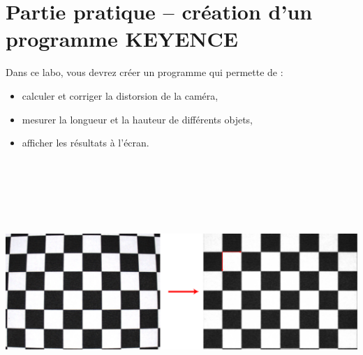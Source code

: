 \section{Partie pratique – création d’un programme KEYENCE} 
\noindent Dans ce labo, vous devrez créer un programme qui permette de : 
\begin{itemize}
  \item calculer et corriger la distorsion de la caméra,
  \item mesurer la longueur et la hauteur de différents objets,
  \item afficher les résultats à l’écran.
\end{itemize}
\vspace{0.3cm}

\noindent
\begin{minipage}[c]{\textwidth}
  \centering
  \includegraphics[width=16cm, height=10cm, keepaspectratio]{addOns/LaboCalib_Practical_chessboard.png}
  \label{fig.Image_RefImagesSwitch}
\end{minipage}\\
\vspace{0.3cm}

